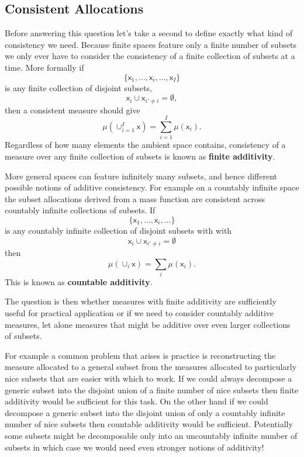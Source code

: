 \documentclass[
  letterpaper,
  DIV=11,
  numbers=noendperiod]{scrartcl}
\begin{document}
\hypertarget{consistent-allocations}{%
\subsection{Consistent Allocations}\label{consistent-allocations}}

Before answering this question let's take a second to define exactly
what kind of consistency we need. Because finite spaces feature only a
finite number of subsets we only ever have to consider the consistency
of a finite collection of subsets at a time. More formally if \[
\{ \mathsf{x}_{1}, \ldots, \mathsf{x}_{i}, \ldots, \mathsf{x}_{I} \}
\] is any finite collection of disjoint subsets, \[
\mathsf{x}_{i} \cup \mathsf{x}_{i' \ne i} = \emptyset,
\] then a consistent measure should give \[
\mu( \cup_{i = 1}^{I} \mathsf{x} )
=
\sum_{i = 1}^{I} \mu( \mathsf{x}_{i}).
\] Regardless of how many elements the ambient space contains,
consistency of a measure over any finite collection of subsets is known
as \textbf{finite additivity}.

More general spaces can feature infinitely many subsets, and hence
different possible notions of additive consistency. For example on a
countably infinite space the subset allocations derived from a mass
function are consistent across countably infinite collections of
subsets. If \[
\{ \mathsf{x}_{1}, \ldots, \mathsf{x}_{i}, \ldots \}
\] is any countably infinite collection of disjoint subsets with with \[
\mathsf{x}_{i} \cup \mathsf{x}_{i' \ne i} = \emptyset
\] then \[
\mu( \cup_{i} \mathsf{x} )
=
\sum_{i} \mu( \mathsf{x}_{i}).
\] This is known as \textbf{countable additivity}.

The question is then whether measures with finite additivity are
sufficiently useful for practical application or if we need to consider
countably additive measures, let alone measures that might be additive
over even larger collections of subsets.

For example a common problem that arises is practice is reconstructing
the measure allocated to a general subset from the measures allocated to
particularly nice subsets that are easier with which to work. If we
could always decompose a generic subset into the disjoint union of a
finite number of nice subsets then finite additivity would be sufficient
for this task. On the other hand if we could decompose a generic subset
into the disjoint union of only a countably infinite number of nice
subsets then countable additivity would be sufficient. Potentially some
subsets might be decomposable only into an uncountably infinite number
of subsets in which case we would need even stronger notions of
additivity!
\end{document}
